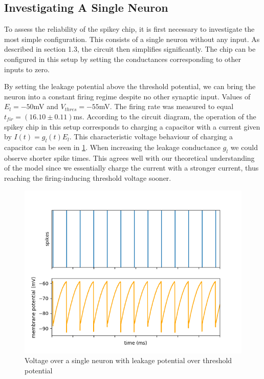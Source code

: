 \documentclass[10pt,a4paper]{article}
\begin{document}
\subsection{Investigating A Single Neuron}
To assess the reliability of the spikey chip, it is first necessary to investigate
the most simple configuration. This consists of a single neuron without any
input.  As described in section 1.3,  the circuit then simplifies significantly.
The chip can be configured in this setup by setting the conductances
corresponding to other inputs to zero.  \par
By setting the leakage potential above the threshold potential, we can bring
the neuron into a constant firing regime despite no other synaptic input.
Values of $E_l = -50$mV and $V_{thres} = -55$mV.  The firing rate was
measured to equal $t_{fir} = (16.10\pm0.11)$ms.  According to the circuit
diagram,  the operation of the spikey chip in this setup corresponds to
charging a capacitor with a current given by $I(t) = g_l(t)E_l$.  This
characteristic voltage behaviour of charging a capacitor can be seen
in \ref{fig:membranes_ex1}.  When increasing the leakage conductance $g_l$ we
could observe shorter spike times.  This agrees well with our theoretical
understanding of the model since we essentially charge the current with a
stronger current,  thus reaching the firing-inducing threshold voltage sooner.
\begin{figure}[ht]
    \centering
    \includegraphics[width=\textwidth]{figures/fp_task1_1membrane.png}
    \caption{Voltage over a single neuron with leakage potential over threshold potential}
    \label{fig:membranes_ex1}
\end{figure}
\end{document}
